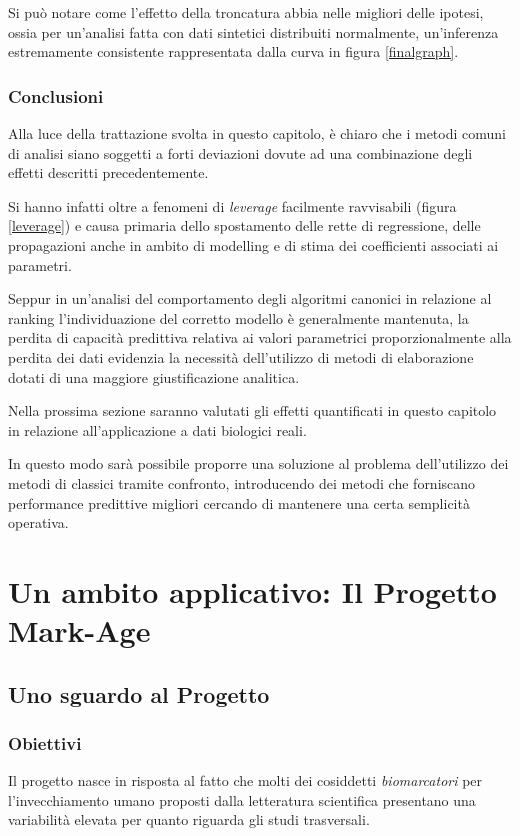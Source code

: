 \documentclass[12pt,openright,twoside,a4paper]{book}
\begin{document}
Si può notare come l'effetto della troncatura abbia nelle migliori delle ipotesi, ossia per un'analisi fatta con dati sintetici distribuiti normalmente, un'inferenza  estremamente consistente rappresentata dalla curva in figura \ref{finalgraph}.

\subsection{Conclusioni}
Alla luce della trattazione svolta in questo capitolo, è chiaro che i metodi comuni di analisi siano soggetti a forti deviazioni dovute ad una combinazione degli effetti descritti precedentemente.

Si hanno infatti oltre a fenomeni di \textit{leverage} facilmente ravvisabili (figura \ref{leverage}) e causa primaria dello spostamento delle rette di regressione, delle propagazioni anche in ambito di modelling e di stima dei coefficienti associati ai parametri.

Seppur in un'analisi del comportamento degli algoritmi canonici in relazione al ranking l'individuazione del corretto modello è generalmente mantenuta, la perdita di capacità predittiva relativa ai valori parametrici proporzionalmente alla perdita dei dati evidenzia la necessità dell'utilizzo di metodi di elaborazione dotati di una maggiore giustificazione analitica.

Nella prossima sezione saranno valutati gli effetti quantificati in questo capitolo in relazione all'applicazione a dati biologici reali.

In questo modo sarà possibile proporre una soluzione al problema dell'utilizzo dei metodi di classici tramite confronto, introducendo dei metodi che forniscano performance predittive migliori cercando di mantenere una certa semplicità operativa.

\chapter{Un ambito applicativo: Il Progetto Mark-Age}
\section{Uno sguardo al Progetto}
\subsection{Obiettivi}
Il progetto nasce in risposta al fatto che molti dei cosiddetti \textit{biomarcatori} per l'invecchiamento umano proposti dalla letteratura scientifica presentano una variabilità elevata per quanto riguarda gli studi trasversali.
\end{document}
